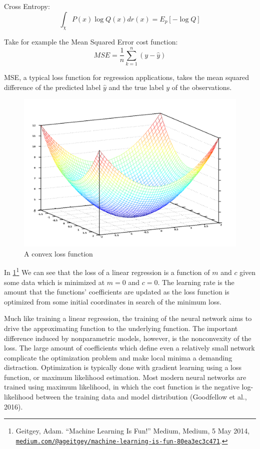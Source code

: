 \documentclass[12pt,twoside]{reedthesis}
\begin{document}
Cross Entropy: \[
\int_\chi P(x) \log Q (x) dr(x) = E_p [- \log Q]
\]

Take for example the Mean Squared Error cost function: \[
MSE = \frac{1}{n} \sum_{k=1}^n  (y - \hat y)
\]

MSE, a typical loss function for regression applications, takes the mean
squared difference of the predicted label \(\hat y\) and the true label
\(y\) of the observations.
\begin{figure}
\includegraphics[width=0.95\linewidth]{figure/optimize} \caption{A convex loss function}\label{fig:optimize}
\end{figure}
In \ref{fig:optimize}\footnote{Geitgey, Adam. ``Machine Learning Is
  Fun!'' Medium, Medium, 5 May 2014,
  \href{mailto:medium.com/@ageitgey/machine-learning-is-fun-80ea3ec3c471}{\nolinkurl{medium.com/@ageitgey/machine-learning-is-fun-80ea3ec3c471}}.}
We can see that the loss of a linear regression is a function of \(m\)
and \(c\) given some data which is minimized at \(m = 0\) and \(c = 0\).
The learning rate is the amount that the functions' coefficients are
updated as the loss function is optimized from some initial coordinates
in search of the minimum loss.

Much like training a linear regression, the training of the neural
network aims to drive the approximating function to the underlying
function. The important difference induced by nonparametric models,
however, is the nonconvexity of the loss. The large amount of
coefficients which define even a relatively small network complicate the
optimization problem and make local minima a demanding distraction.
Optimization is typically done with gradient learning using a loss
function, or maximum likelihood estimation. Most modern neural networks
are trained using maximum likelihood, in which the cost function is the
negative log-likelihood between the training data and model distribution
(Goodfellow et al., 2016).
\end{document}

